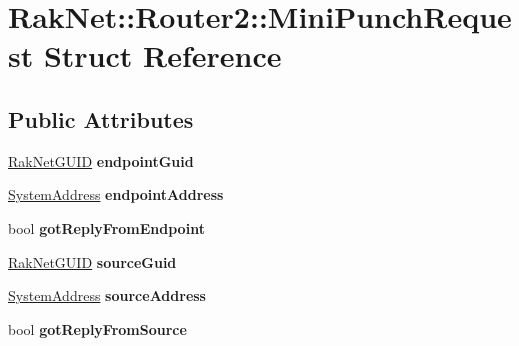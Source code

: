 \hypertarget{struct_rak_net_1_1_router2_1_1_mini_punch_request}{\section{Rak\-Net\-:\-:Router2\-:\-:Mini\-Punch\-Request Struct Reference}
\label{struct_rak_net_1_1_router2_1_1_mini_punch_request}
}
\subsection*{Public Attributes}
\begin{DoxyCompactItemize}
\item 
\hypertarget{struct_rak_net_1_1_router2_1_1_mini_punch_request_a635a115736aa16b7997313f5601ccf3e}{\hyperlink{struct_rak_net_1_1_rak_net_g_u_i_d}{Rak\-Net\-G\-U\-I\-D} {\bfseries endpoint\-Guid}}\label{struct_rak_net_1_1_router2_1_1_mini_punch_request_a635a115736aa16b7997313f5601ccf3e}

\item 
\hypertarget{struct_rak_net_1_1_router2_1_1_mini_punch_request_a218f955fcc0c79c465c30bb68f696a0c}{\hyperlink{struct_rak_net_1_1_system_address}{System\-Address} {\bfseries endpoint\-Address}}\label{struct_rak_net_1_1_router2_1_1_mini_punch_request_a218f955fcc0c79c465c30bb68f696a0c}

\item 
\hypertarget{struct_rak_net_1_1_router2_1_1_mini_punch_request_a3d63154829c96eefef5f8e3d11dbbde9}{bool {\bfseries got\-Reply\-From\-Endpoint}}\label{struct_rak_net_1_1_router2_1_1_mini_punch_request_a3d63154829c96eefef5f8e3d11dbbde9}

\item 
\hypertarget{struct_rak_net_1_1_router2_1_1_mini_punch_request_a2e9f8e740b153e264d0a5d03d2e13afd}{\hyperlink{struct_rak_net_1_1_rak_net_g_u_i_d}{Rak\-Net\-G\-U\-I\-D} {\bfseries source\-Guid}}\label{struct_rak_net_1_1_router2_1_1_mini_punch_request_a2e9f8e740b153e264d0a5d03d2e13afd}

\item 
\hypertarget{struct_rak_net_1_1_router2_1_1_mini_punch_request_aae715accaa6415653de8093ff9734f22}{\hyperlink{struct_rak_net_1_1_system_address}{System\-Address} {\bfseries source\-Address}}\label{struct_rak_net_1_1_router2_1_1_mini_punch_request_aae715accaa6415653de8093ff9734f22}

\item 
\hypertarget{struct_rak_net_1_1_router2_1_1_mini_punch_request_a67e353e110cea9d73053dad96a27e213}{bool {\bfseries got\-Reply\-From\-Source}}\label{struct_rak_net_1_1_router2_1_1_mini_punch_request_a67e353e110cea9d73053dad96a27e213}


\end{DoxyCompactItemize}
